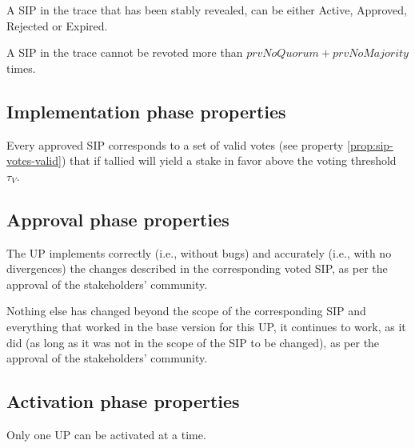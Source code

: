 \begin{property}\label{prop:sip-tally-result}
  A SIP in the trace that has been stably revealed, can be either Active,
  Approved, Rejected or Expired.
\end{property}

\begin{property}\label{prop:sip-revote}
  A SIP in the trace cannot be revoted more than $prvNoQuorum + prvNoMajority$
  times.
\end{property}

\subsection{Implementation phase properties}

\begin{property}\label{prop:sip-approved-valid}
  Every approved SIP corresponds to a set of valid votes (see property
  \ref{prop:sip-votes-valid}) that if tallied will yield a stake in favor above
  the voting threshold $\tau_V$.
\end{property}

\subsection{Approval phase properties}

\begin{property}\label{prop:corr-accuracy}
  The UP implements correctly (i.e., without bugs) and accurately (i.e., with no
  divergences) the changes described in the corresponding voted SIP, as per the
  approval of the stakeholders' community.
\end{property}

\begin{property}[Continuity]\label{prop:continuity}
  Nothing else has changed beyond the scope of the corresponding SIP and
  everything that worked in the base version for this UP, it continues to work,
  as it did (as long as it was not in the scope of the SIP to be changed), as
  per the approval of the stakeholders' community.
\end{property}

\subsection{Activation phase properties}

\begin{property}\label{prop:seq-activation}
  Only one UP can be activated at a time.
\end{property}

